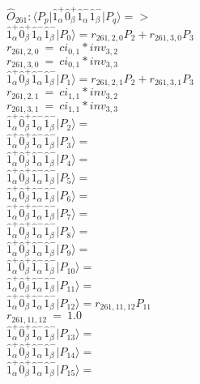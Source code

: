 \documentclass[14pt]{article}
\begin{document}
    $\hat{O}_{261}:  \langle{P_p}\vert \hat{1}_{\alpha}^{+}\hat{0}_{\beta}^{+}\hat{1}_{\alpha}^{-}\hat{1}_{\beta}^{-} \vert{P_q}\rangle => $ \\ 
    $ \hat{1}_{\alpha}^{+}\hat{0}_{\beta}^{+}\hat{1}_{\alpha}^{-}\hat{1}_{\beta}^{-} \vert{P_{0}}\rangle = {r}_{261,2,0}P_{2}+{r}_{261,3,0}P_{3} $ \\ 
    ${r}_{261,2,0}\ =\ {ci}_{0,1}*{inv}_{3,2} $ \\ 
    ${r}_{261,3,0}\ =\ {ci}_{0,1}*{inv}_{3,3} $ \\ 
    $ \hat{1}_{\alpha}^{+}\hat{0}_{\beta}^{+}\hat{1}_{\alpha}^{-}\hat{1}_{\beta}^{-} \vert{P_{1}}\rangle = {r}_{261,2,1}P_{2}+{r}_{261,3,1}P_{3} $ \\ 
    ${r}_{261,2,1}\ =\ {ci}_{1,1}*{inv}_{3,2} $ \\ 
    ${r}_{261,3,1}\ =\ {ci}_{1,1}*{inv}_{3,3} $ \\ 
    $ \hat{1}_{\alpha}^{+}\hat{0}_{\beta}^{+}\hat{1}_{\alpha}^{-}\hat{1}_{\beta}^{-} \vert{P_{2}}\rangle =  $ \\ 
    $ \hat{1}_{\alpha}^{+}\hat{0}_{\beta}^{+}\hat{1}_{\alpha}^{-}\hat{1}_{\beta}^{-} \vert{P_{3}}\rangle =  $ \\ 
    $ \hat{1}_{\alpha}^{+}\hat{0}_{\beta}^{+}\hat{1}_{\alpha}^{-}\hat{1}_{\beta}^{-} \vert{P_{4}}\rangle =  $ \\ 
    $ \hat{1}_{\alpha}^{+}\hat{0}_{\beta}^{+}\hat{1}_{\alpha}^{-}\hat{1}_{\beta}^{-} \vert{P_{5}}\rangle =  $ \\ 
    $ \hat{1}_{\alpha}^{+}\hat{0}_{\beta}^{+}\hat{1}_{\alpha}^{-}\hat{1}_{\beta}^{-} \vert{P_{6}}\rangle =  $ \\ 
    $ \hat{1}_{\alpha}^{+}\hat{0}_{\beta}^{+}\hat{1}_{\alpha}^{-}\hat{1}_{\beta}^{-} \vert{P_{7}}\rangle =  $ \\ 
    $ \hat{1}_{\alpha}^{+}\hat{0}_{\beta}^{+}\hat{1}_{\alpha}^{-}\hat{1}_{\beta}^{-} \vert{P_{8}}\rangle =  $ \\ 
    $ \hat{1}_{\alpha}^{+}\hat{0}_{\beta}^{+}\hat{1}_{\alpha}^{-}\hat{1}_{\beta}^{-} \vert{P_{9}}\rangle =  $ \\ 
    $ \hat{1}_{\alpha}^{+}\hat{0}_{\beta}^{+}\hat{1}_{\alpha}^{-}\hat{1}_{\beta}^{-} \vert{P_{10}}\rangle =  $ \\ 
    $ \hat{1}_{\alpha}^{+}\hat{0}_{\beta}^{+}\hat{1}_{\alpha}^{-}\hat{1}_{\beta}^{-} \vert{P_{11}}\rangle =  $ \\ 
    $ \hat{1}_{\alpha}^{+}\hat{0}_{\beta}^{+}\hat{1}_{\alpha}^{-}\hat{1}_{\beta}^{-} \vert{P_{12}}\rangle = {r}_{261,11,12}P_{11} $ \\ 
    ${r}_{261,11,12}\ =\ 1.0 $ \\ 
    $ \hat{1}_{\alpha}^{+}\hat{0}_{\beta}^{+}\hat{1}_{\alpha}^{-}\hat{1}_{\beta}^{-} \vert{P_{13}}\rangle =  $ \\ 
    $ \hat{1}_{\alpha}^{+}\hat{0}_{\beta}^{+}\hat{1}_{\alpha}^{-}\hat{1}_{\beta}^{-} \vert{P_{14}}\rangle =  $ \\ 
    $ \hat{1}_{\alpha}^{+}\hat{0}_{\beta}^{+}\hat{1}_{\alpha}^{-}\hat{1}_{\beta}^{-} \vert{P_{15}}\rangle =  $ \\ 
    
\end{document}
